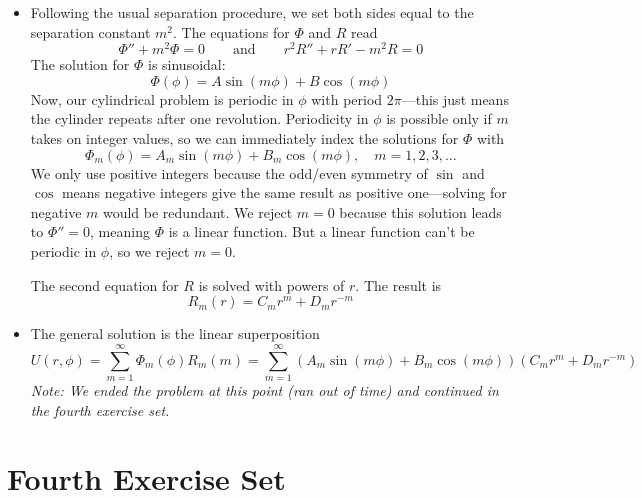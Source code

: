 \documentclass[11pt, a4paper]{article}
\newcommand{\eqtext}[1]{\qquad \text{#1} \qquad}
\begin{document}
\begin{itemize}
	\item Following the usual separation procedure, we set both sides equal to the separation constant $ m^{2} $. The equations for $ \Phi $ and $ R $ read
	\begin{equation*}
		\Phi'' + m^{2} \Phi = 0 \eqtext{and} r^{2}R'' + rR' - m^{2}R = 0
	\end{equation*}
	The solution for $ \Phi $ is sinusoidal:
	\begin{equation*}
		\Phi(\phi) = A \sin(m\phi) + B\cos(m\phi)
	\end{equation*}
	Now, our cylindrical problem is periodic in $ \phi $ with period $ 2\pi $---this just means the cylinder repeats after one revolution. Periodicity in $ \phi $ is possible only if $ m $ takes on integer values, so we can immediately index the solutions for $ \Phi $ with
	\begin{equation*}
		\Phi_{m}(\phi) = A_{m} \sin(m\phi) + B_{m}\cos(m\phi), \quad m = 1, 2, 3, \ldots 
	\end{equation*}
	We only use positive integers because the odd/even symmetry of $ \sin $ and $ \cos $ means negative integers give the same result as positive one---solving for negative $ m $ would be redundant. We reject $ m = 0 $ because this solution leads to $ \Phi'' = 0 $, meaning $ \Phi $ is a linear function. But a linear function can't be periodic in $ \phi $, so we reject $ m = 0 $.
	
	The second equation for $ R $ is solved with powers of $ r $. The result is
	\begin{equation*}
		R_{m}(r) = C_{m}r^{m} + D_{m}r^{-m}
	\end{equation*}
	
	\item The general solution is the linear superposition
	\begin{equation*}
		U(r, \phi) = \sum_{m = 1}^{\infty}\Phi_{m}(\phi)R_{m}(m) = \sum_{m = 1}^{\infty} \left(A_{m} \sin(m\phi) + B_{m}\cos(m\phi)\right)\left( C_{m}r^{m} + D_{m}r^{-m} \right)
	\end{equation*}
	\textit{Note: We ended the problem at this point (ran out of time) and continued in the fourth exercise set.}

	\end{itemize}
	
\section{Fourth Exercise Set}
\end{document}
